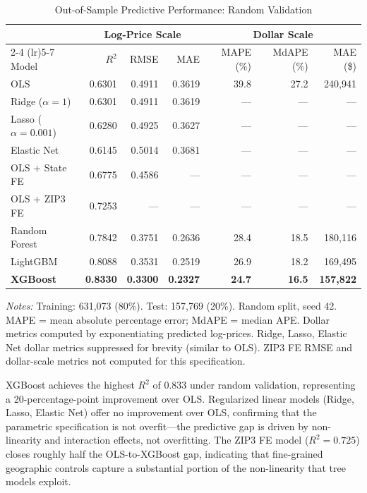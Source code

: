 \begin{table}[H]
\centering
\caption{Out-of-Sample Predictive Performance: Random Validation}
\label{tab:ml_comparison}
\begin{threeparttable}
\small
\begin{tabular}{lrrrrrr}
\toprule
 & \multicolumn{3}{c}{Log-Price Scale} & \multicolumn{3}{c}{Dollar Scale} \\
\cmidrule(lr){2-4} \cmidrule(lr){5-7}
Model & $R^2$ & RMSE & MAE & MAPE (\%) & MdAPE (\%) & MAE (\$) \\
\midrule
OLS & 0.6301 & 0.4911 & 0.3619 & 39.8 & 27.2 & 240,941 \\
Ridge ($\alpha=1$) & 0.6301 & 0.4911 & 0.3619 & --- & --- & --- \\
Lasso ($\alpha=0.001$) & 0.6280 & 0.4925 & 0.3627 & --- & --- & --- \\
Elastic Net & 0.6145 & 0.5014 & 0.3681 & --- & --- & --- \\
OLS + State FE & 0.6775 & 0.4586 & --- & --- & --- & --- \\
OLS + ZIP3 FE & 0.7253 & --- & --- & --- & --- & --- \\
Random Forest & 0.7842 & 0.3751 & 0.2636 & 28.4 & 18.5 & 180,116 \\
LightGBM & 0.8088 & 0.3531 & 0.2519 & 26.9 & 18.2 & 169,495 \\
\textbf{XGBoost} & \textbf{0.8330} & \textbf{0.3300} & \textbf{0.2327} & \textbf{24.7} & \textbf{16.5} & \textbf{157,822} \\
\bottomrule
\end{tabular}
\begin{tablenotes}
\small
\item \textit{Notes:} Training: 631,073 (80\%). Test: 157,769 (20\%). Random split, seed 42. MAPE = mean absolute percentage error; MdAPE = median APE. Dollar metrics computed by exponentiating predicted log-prices. Ridge, Lasso, Elastic Net dollar metrics suppressed for brevity (similar to OLS). ZIP3 FE RMSE and dollar-scale metrics not computed for this specification.
\end{tablenotes}
\end{threeparttable}
\end{table}

XGBoost achieves the highest $R^2$ of 0.833 under random validation, representing a 20-percentage-point improvement over OLS. Regularized linear models (Ridge, Lasso, Elastic Net) offer no improvement over OLS, confirming that the parametric specification is not overfit---the predictive gap is driven by non-linearity and interaction effects, not overfitting. The ZIP3 FE model ($R^2 = 0.725$) closes roughly half the OLS-to-XGBoost gap, indicating that fine-grained geographic controls capture a substantial portion of the non-linearity that tree models exploit.

